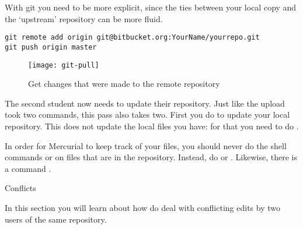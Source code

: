 With git you need to be more explicit, since the ties between your
local copy and the `upstream' repository can be more fluid.
\begin{verbatim}
git remote add origin git@bitbucket.org:YourName/yourrepo.git
git push origin master
\end{verbatim}

\begin{figure}[ht]
  \texttt{[image: git-pull]}
  \caption{Get changes that were made to the remote repository}
  \label{fig:git-pull}
\end{figure}

The second student now needs to update their repository. Just like the
upload took two commands, this pass also takes two. First you do  to update your local repository. This does not update the
local files you have: for that you need to do .



In order for Mercurial to keep track of your files, you should never do
the shell commands
 or  on files that are in the repository. Instead, do
 or . Likewise, there is a command .

 {Conflicts}

\begin{purpose}
  In this section you will learn about how do deal with conflicting
  edits by two users of the same repository.
\end{purpose}

